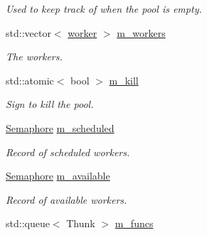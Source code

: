\begin{DoxyCompactItemize}
\begin{tabbing}
\end{tabbing}\begin{DoxyCompactList}\small\item\em Used to keep track of when the pool is empty. \end{DoxyCompactList}\item 
\mbox{\label{classnta_1_1ThreadPool_adc58f79ddcabb42ec65d4f26526ce914}} 
std\+::vector$<$ \hyperlink{structnta_1_1ThreadPool_1_1worker}{worker} $>$ \hyperlink{classnta_1_1ThreadPool_adc58f79ddcabb42ec65d4f26526ce914}{m\+\_\+workers}
\begin{DoxyCompactList}\small\item\em The workers. \end{DoxyCompactList}\item 
\mbox{\label{classnta_1_1ThreadPool_a2328672ee0ae326f21b138dcbdaf67b6}} 
std\+::atomic$<$ bool $>$ \hyperlink{classnta_1_1ThreadPool_a2328672ee0ae326f21b138dcbdaf67b6}{m\+\_\+kill}
\begin{DoxyCompactList}\small\item\em Sign to kill the pool. \end{DoxyCompactList}\item 
\mbox{\label{classnta_1_1ThreadPool_a7dd1a6a6e66450693352f0a9b977601e}} 
\hyperlink{classnta_1_1Semaphore}{Semaphore} \hyperlink{classnta_1_1ThreadPool_a7dd1a6a6e66450693352f0a9b977601e}{m\+\_\+scheduled}
\begin{DoxyCompactList}\small\item\em Record of scheduled workers. \end{DoxyCompactList}\item 
\mbox{\label{classnta_1_1ThreadPool_aa8b2b5a0a2642604c5df5533c9c5f336}} 
\hyperlink{classnta_1_1Semaphore}{Semaphore} \hyperlink{classnta_1_1ThreadPool_aa8b2b5a0a2642604c5df5533c9c5f336}{m\+\_\+available}
\begin{DoxyCompactList}\small\item\em Record of available workers. \end{DoxyCompactList}\item 
\mbox{\label{classnta_1_1ThreadPool_a4679d6f33473911f05f2241b69538544}} 
std\+::queue$<$ Thunk $>$ \hyperlink{classnta_1_1ThreadPool_a4679d6f33473911f05f2241b69538544}{m\+\_\+funcs}

\end{DoxyCompactItemize}
